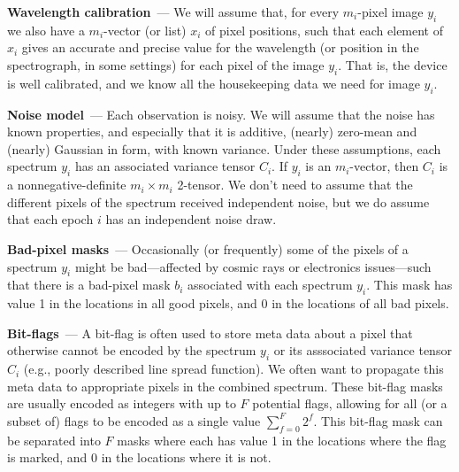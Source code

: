 \documentclass[modern]{aastex631}
\renewcommand{\paragraph}[1]{\medskip\par\noindent\textbf{#1}~---}
\begin{document}
\paragraph{Wavelength calibration}
We will assume that, for every $m_i$-pixel image $y_i$ we also have a $m_i$-vector (or list) $x_i$ of pixel positions, such that each element of $x_i$ gives an accurate and precise value for the wavelength (or position in the spectrograph, in some settings) for each pixel of the image $y_i$.
That is, the device is well calibrated, and we know all the housekeeping data we need for image $y_i$.

\paragraph{Noise model}
Each observation is noisy.
We will assume that the noise has known properties, and especially that it is additive, (nearly) zero-mean and (nearly) Gaussian in form, with known variance.
Under these assumptions, each spectrum $y_i$ has an associated variance tensor $C_i$.
If $y_i$ is an $m_i$-vector, then $C_i$ is a nonnegative-definite $m_i\times m_i$ 2-tensor.
We don't need to assume that the different pixels of the spectrum received independent noise, but we do assume that each epoch $i$ has an independent noise draw.

\paragraph{Bad-pixel masks}
Occasionally (or frequently) some of the pixels of a spectrum $y_i$ might be bad---affected by cosmic rays or electronics issues---such that there is a bad-pixel mask $b_i$ associated with each spectrum $y_i$.
This mask has value 1 in the locations in all good pixels, and 0 in the locations of all bad pixels.

\paragraph{Bit-flags}
A bit-flag is often used to store meta data about a pixel that otherwise cannot be encoded by the spectrum $y_i$ or its asssociated variance tensor $C_i$ (e.g., poorly described line spread function). 
We often want to propagate this meta data to appropriate pixels in the combined spectrum. 
These bit-flag masks are usually encoded as integers with up to $F$ potential flags, allowing for all (or a subset of) flags to be encoded as a single value $\sum^{F}_{f=0} 2^f$. 
This bit-flag mask can be separated into $F$ masks where each has value 1 in the locations where the flag is marked, and 0 in the locations where it is not.
\end{document}
